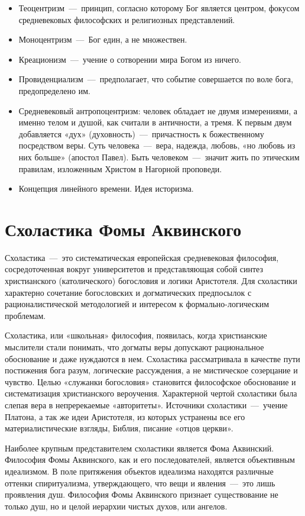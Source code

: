 \documentclass[14pt]{extarticle}
\begin{document}
\begin{itemize}
	\item Теоцентризм~—~принцип, согласно которому Бог является центром, фокусом средневековых философских и религиозных представлений.
	\item Моноцентризм~—~Бог един, а не множествен.
	\item Креационизм~—~учение о сотворении мира Богом из ничего.
	\item Провиденциализм~—~предполагает, что событие совершается по воле бога, предопределено им.
	\item Средневековый антропоцентризм: человек обладает не двумя измерениями, а именно телом и душой, как считали в античности, а тремя. К первым двум добавляется «дух» (духовность)~—~причастность к божественному посредством веры. Суть человека~—~вера, надежда, любовь, «но любовь из них больше» (апостол Павел). Быть человеком~—~значит жить по этическим правилам, изложенным Христом в Нагорной проповеди.
	\item Концепция линейного времени. Идея историзма.
\end{itemize}


\section{Схоластика Фомы Аквинского}
Схоластика~---~это систематическая европейская средневековая философия, сосредоточенная вокруг университетов и представляющая собой синтез христианского (католического) богословия и логики Аристотеля. Для схоластики характерно сочетание богословских и догматических предпосылок с рационалистической методологией и интересом к формально-логическим проблемам. 

 Схоластика, или «школьная» философия, появилась, когда христианские мыслители стали понимать, что догматы веры допускают рациональное обоснование и даже нуждаются в нем. Схоластика рассматривала в качестве пути постижения бога разум, логические рассуждения, а не мистическое созерцание и чувство. Целью «служанки богословия» становится философское обоснование и систематизация христианского вероучения. Характерной чертой схоластики была слепая вера в непререкаемые «авторитеты». Источники схоластики~---~учение Платона, а так же идеи Аристотеля, из которых устранены все его материалистические взгляды, Библия, писание «отцов церкви».

Наиболее крупным представителем схоластики является Фома Аквинский. Философия Фомы Аквинского, как и его последователей, является объективным идеализмом. В поле притяжения объектов идеализма находятся различные оттенки спиритуализма, утверждающего, что вещи и явления~---~это лишь проявления душ. Философия Фомы Аквинского признает существование не только душ, но и целой иерархии чистых духов, или ангелов.
\end{document}
